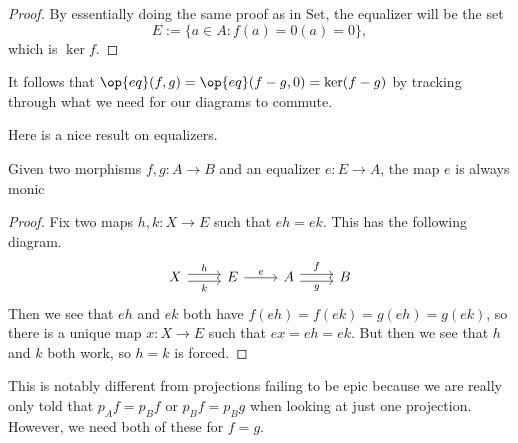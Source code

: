 \documentclass[../notes.tex]{subfiles}
\begin{document}
\begin{proof}
	By essentially doing the same proof as in $\mathrm{Set}$, the equalizer will be the set
	\[E:=\{a\in A:f(a)=0(a)=0\},\]
	which is $\ker f$.
\end{proof}
\begin{remark}
	It follows that $\op{eq}(f,g)=\op{eq}(f-g,0)=\ker(f-g)$ by tracking through what we need for our diagrams to commute.
\end{remark}
Here is a nice result on equalizers.
\begin{prop}
	Given two morphisms $f,g:A\to B$ and an equalizer $e:E\to A$, the map $e$ is always monic
\end{prop}
\begin{proof}
	Fix two maps $h,k:X\to E$ such that $eh=ek$. This has the following diagram.
	\[\begin{tikzcd}
		X & E & A & B
		\arrow["g"', shift right=1, from=1-3, to=1-4]
		\arrow["f", shift left=1, from=1-3, to=1-4]
		\arrow["e", from=1-2, to=1-3]
		\arrow["h", shift left=1, from=1-1, to=1-2]
		\arrow["k"', shift right=1, from=1-1, to=1-2]
	\end{tikzcd}\]
	Then we see that $eh$ and $ek$ both have $f(eh)=f(ek)=g(eh)=g(ek)$, so there is a unique map $x:X\to E$ such that $ex=eh=ek$. But then we see that $h$ and $k$ both work, so $h=k$ is forced.
\end{proof}
\begin{remark}
	This is notably different from projections failing to be epic because we are really only told that $p_Af=p_Bf$ or $p_Bf=p_Bg$ when looking at just one projection. However, we need both of these for $f=g$.
\end{remark}
\end{document}
